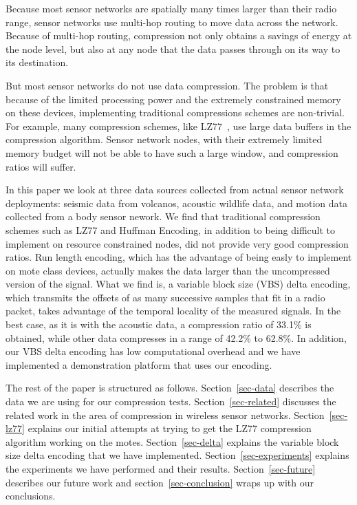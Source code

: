Because most sensor networks are spatially many times larger than
their radio range, sensor networks use multi-hop routing to move data
across the network.  Because of multi-hop routing, compression not
only obtains a savings of energy at the node level, but also at any
node that the data passes through on its way to its destination.

But most sensor networks do not use data compression.  The problem is
that because of the limited processing power and the extremely
constrained memory on these devices, implementing traditional
compressions schemes are non-trivial.  For example, many compression
schemes, like LZ77~\cite{lz77}, use large data buffers in the
compression algorithm.  Sensor network nodes, with their extremely
limited memory budget will not be able to have such a large window,
and compression ratios will suffer.

In this paper we look at three data sources collected from actual
sensor network deployments: seismic data from volcanos, acoustic
wildlife data, and motion data collected from a body sensor nework.
We find that traditional compression schemes such as LZ77 and Huffman
Encoding, in addition to being difficult to implement on resource
constrained nodes, did not provide very good compression ratios.  Run
length encoding, which has the advantage of being easly to implement
on mote class devices, actually makes the data larger than the
uncompressed version of the signal.  What we find is, a variable block
size (VBS) delta encoding, which transmits the offsets of as many
successive samples that fit in a radio packet, takes advantage of the
temporal locality of the measured signals.  In the best case, as it is
with the acoustic data, a compression ratio of 33.1\% is obtained,
while other data compresses in a range of 42.2\% to 62.8\%.  In
addition, our VBS delta encoding has low computational overhead and we
have implemented a demonstration platform that uses our encoding.

The rest of the paper is structured as follows.
Section~\ref{sec-data} describes the data we are using for our
compression tests.  Section~\ref{sec-related} discusses the related
work in the area of compression in wireless sensor networks.
Section~\ref{sec-lz77} explains our initial attempts at trying to get
the LZ77 compression algorithm working on the
motes. Section~\ref{sec-delta} explains the variable block size delta
encoding that we have implemented.  Section~\ref{sec-experiments}
explains the experiments we have performed and their results.
Section~\ref{sec-future} describes our future work and
section~\ref{sec-conclusion} wraps up with our conclusions.
